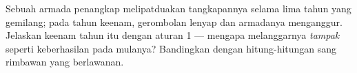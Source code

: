 \begin{exercise}[$\star\star\star$]\label{exo:g5:people-and-nature:11}
Sebuah armada penangkap  melipatduakan tangkapannya selama lima
tahun yang gemilang; pada tahun keenam, gerombolan  lenyap dan
armadanya menganggur. Jelaskan keenam tahun itu dengan aturan 1 ---
mengapa melanggarnya \emph{tampak} seperti keberhasilan pada mulanya?
Bandingkan dengan hitung-hitungan sang rimbawan yang berlawanan.
\end{exercise}
